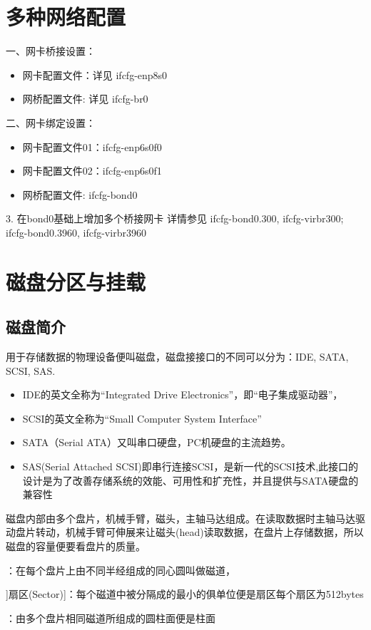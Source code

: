 \section{多种网络配置}
一、网卡桥接设置：
\begin{itemize}
 \item 网卡配置文件：详见 ifcfg-enp8s0
\item 网桥配置文件: 详见 ifcfg-br0
\end{itemize}

二、网卡绑定设置：
\begin{itemize}
\item 网卡配置文件01：ifcfg-enp6s0f0
\item 网卡配置文件02：ifcfg-enp6s0f1
\item 网桥配置文件: ifcfg-bond0
\end{itemize}

3. 在bond0基础上增加多个桥接网卡
详情参见 ifcfg-bond0.300, ifcfg-virbr300;  ifcfg-bond0.3960, ifcfg-virbr3960

\section{磁盘分区与挂载}

\subsection{磁盘简介}
用于存储数据的物理设备便叫磁盘，磁盘接接口的不同可以分为：IDE,  SATA, SCSI, SAS.

\begin{itemize}
\item IDE的英文全称为“Integrated Drive Electronics”，即“电子集成驱动器”，
\item SCSI的英文全称为“Small Computer System Interface”
\item SATA（Serial ATA）又叫串口硬盘，PC机硬盘的主流趋势。
\item SAS(Serial Attached SCSI)即串行连接SCSI，是新一代的SCSI技术,此接口的设计是为了改善存储系统的效能、可用性和扩充性，并且提供与SATA硬盘的兼容性
\end{itemize}

磁盘内部由多个盘片，机械手臂，磁头，主轴马达组成。在读取数据时主轴马达驱动盘片转动，机械手臂可伸展来让磁头(head)读取数据，在盘片上存储数据，所以磁盘的容量便要看盘片的质量。

\begin{description}
	\item[磁道(Track)]：在每个盘片上由不同半经组成的同心圆叫做磁道，
	\item]扇区(Sector)]：每个磁道中被分隔成的最小的俱单位便是扇区每个扇区为512bytes
	\item[柱面(Cylinder)]：由多个盘片相同磁道所组成的圆柱面便是柱面
\end{description}

